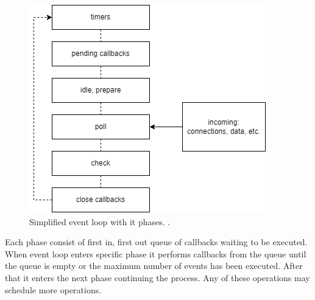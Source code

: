 \begin{figure}[htbp]
    \includegraphics[scale=0.8]{images/event_loop.png}
    \caption{Simplified event loop with it phases. \cite{node.jsEventLoop}.}
    \label{figure:nodejs:eventloop}
\end{figure}

Each phase consist of first in, first out queue of callbacks waiting to be executed.
When event loop enters specific phase it performs callbacks from the queue until the queue is empty or the maximum number of events has been executed.
After that it enters the next phase continuing the process.
Any of these operations may schedule more operations.

